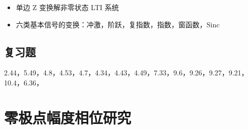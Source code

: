 \documentclass[cn,11pt,chinese,black,simple]{elegantbook}
\begin{document}
\begin{itemize}
    \item 单边 Z 变换解非零状态 LTI 系统
    \item 六类基本信号的变换：冲激，阶跃，复指数，指数，窗函数，\(\mathrm{Sinc}\)
\end{itemize}

\section{复习题}

2.44，5.49，4.8，4.53，4.7，4.34，4.43，4.49，7.33，9.6，9.26，9.27，9.21，10.4，6.36，


\appendix

\chapter{零极点幅度相位研究}




\let\chapname\undefined
\ifx\mainclass\undefined
\end{document}
